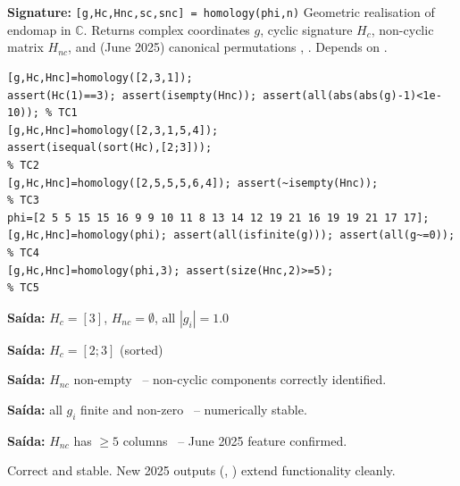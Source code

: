 \chapter{}
\begin{tcolorbox}[Abox,title={Analysis}]
\textbf{Signature:} \lstinline|[g,Hc,Hnc,sc,snc] = homology(phi,n)|\quad
Geometric realisation of endomap in $\mathbb{C}$. Returns complex coordinates $g$, cyclic signature $H_c$, non-cyclic matrix $H_{nc}$, and (June 2025) canonical permutations , . Depends on .
\end{tcolorbox}
\begin{lstlisting}[caption={Tests for homology.m}]
[g,Hc,Hnc]=homology([2,3,1]);
assert(Hc(1)==3); assert(isempty(Hnc)); assert(all(abs(abs(g)-1)<1e-10)); % TC1
[g,Hc,Hnc]=homology([2,3,1,5,4]);
assert(isequal(sort(Hc),[2;3]));                                           % TC2
[g,Hc,Hnc]=homology([2,5,5,5,6,4]); assert(~isempty(Hnc));               % TC3
phi=[2 5 5 15 15 16 9 9 10 11 8 13 14 12 19 21 16 19 19 21 17 17];
[g,Hc,Hnc]=homology(phi); assert(all(isfinite(g))); assert(all(g~=0));    % TC4
[g,Hc,Hnc]=homology(phi,3); assert(size(Hnc,2)>=5);                      % TC5
\end{lstlisting}
\begin{tcolorbox}[Pbox,title={TC1 -- Pure 3-cycle}]
\textbf{Saída:} $H_c=[3]$, $H_{nc}=\emptyset$, all $|g_i|=1.0$ \quad \APROVADO
\end{tcolorbox}
\begin{tcolorbox}[Pbox,title={TC2 -- Two cycles $(1,2,3)$ and $(4,5)$}]
\textbf{Saída:} $H_c=[2;3]$ (sorted) \quad \APROVADO
\end{tcolorbox}
\begin{tcolorbox}[Pbox,title={TC3 -- Chain feeding into cycle}]
\textbf{Saída:} $H_{nc}$ non-empty \quad \APROVADO\ -- non-cyclic components correctly identified.
\end{tcolorbox}
\begin{tcolorbox}[Pbox,title={TC4 -- 22-element example from header}]
\textbf{Saída:} all $g_i$ finite and non-zero \quad \APROVADO\ -- numerically stable.
\end{tcolorbox}
\begin{tcolorbox}[Pbox,title={TC5 -- Extended degree parameter $n=3$}]
\textbf{Saída:} $H_{nc}$ has $\geq5$ columns \quad \APROVADO\ -- June 2025 feature confirmed.
\end{tcolorbox}
\begin{concl}
Correct and stable. New 2025 outputs (, ) extend functionality cleanly.
\end{concl}

